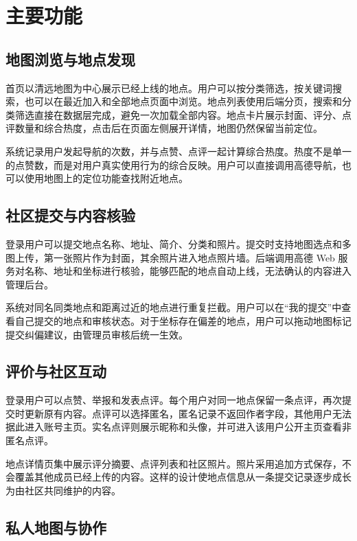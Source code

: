 \documentclass[UTF8,a4paper,12pt]{ctexart}
\begin{document}
\section{主要功能}

\subsection{地图浏览与地点发现}

首页以清远地图为中心展示已经上线的地点。用户可以按分类筛选，按关键词搜索，也可以在最近加入和全部地点页面中浏览。地点列表使用后端分页，搜索和分类筛选直接在数据层完成，避免一次加载全部内容。地点卡片展示封面、评分、点评数量和综合热度，点击后在页面左侧展开详情，地图仍然保留当前定位。

系统记录用户发起导航的次数，并与点赞、点评一起计算综合热度。热度不是单一的点赞数，而是对用户真实使用行为的综合反映。用户可以直接调用高德导航，也可以使用地图上的定位功能查找附近地点。

\subsection{社区提交与内容核验}

登录用户可以提交地点名称、地址、简介、分类和照片。提交时支持地图选点和多图上传，第一张照片作为封面，其余照片进入地点照片墙。后端调用高德 Web 服务对名称、地址和坐标进行核验，能够匹配的地点自动上线，无法确认的内容进入管理后台。

系统对同名同类地点和距离过近的地点进行重复拦截。用户可以在“我的提交”中查看自己提交的地点和审核状态。对于坐标存在偏差的地点，用户可以拖动地图标记提交纠偏建议，由管理员审核后统一生效。

\subsection{评价与社区互动}

登录用户可以点赞、举报和发表点评。每个用户对同一地点保留一条点评，再次提交时更新原有内容。点评可以选择匿名，匿名记录不返回作者字段，其他用户无法据此进入账号主页。实名点评则展示昵称和头像，并可进入该用户公开主页查看非匿名点评。

地点详情页集中展示评分摘要、点评列表和社区照片。照片采用追加方式保存，不会覆盖其他成员已经上传的内容。这样的设计使地点信息从一条提交记录逐步成长为由社区共同维护的内容。

\subsection{私人地图与协作}
\end{document}
